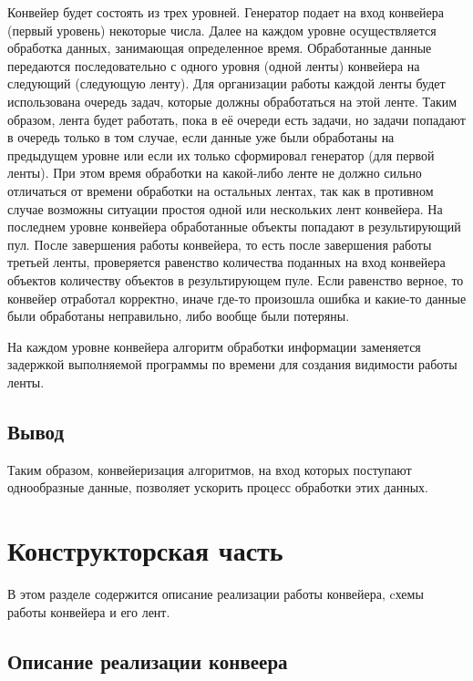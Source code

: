 \documentclass[a4paper,12pt]{report}
\begin{document}
\hspace{0.6cm}Конвейер будет состоять из трех уровней. Генератор подает на вход конвейера (первый уровень) некоторые числа. Далее на каждом уровне осуществляется обработка данных, занимающая определенное время. Обработанные данные передаются последовательно с одного уровня (одной ленты) конвейера на следующий (следующую ленту). Для организации работы каждой ленты будет использована очередь задач, которые должны обработаться на этой ленте. Таким образом, лента будет работать, пока в её очереди есть задачи, но задачи попадают в очередь только в том случае, если данные уже были обработаны на предыдущем уровне или если их только сформировал генератор (для первой ленты). При этом время обработки на какой-либо ленте не должно сильно отличаться от времени обработки на остальных лентах, так как в противном случае возможны ситуации простоя одной или нескольких лент конвейера. На последнем уровне конвейера обработанные объекты попадают в результирующий пул. После завершения работы конвейера, то есть после завершения работы третьей ленты, проверяется равенство количества поданных на вход конвейера объектов количеству объектов в результирующем пуле. Если равенство верное, то конвейер отработал корректно, иначе где-то произошла ошибка и какие-то данные были обработаны неправильно, либо вообще были потеряны.

На каждом уровне конвейера алгоритм обработки информации заменяется задержкой выполняемой программы по времени для создания видимости работы ленты.

\section{Вывод}
\hspace{0.6cm}Таким образом, конвейеризация алгоритмов, на вход которых поступают однообразные данные, позволяет ускорить процесс обработки этих данных.

\chapter{Конструкторская часть}
\hspace{0.6cm}В этом разделе содержится описание реализации работы конвейера, cхемы работы конвейера и его лент.

\section{Описание реализации конвеера}
\end{document}
